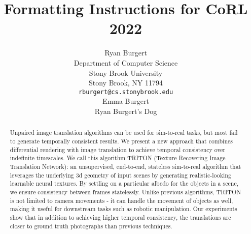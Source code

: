 \documentclass{article}
\title{Formatting Instructions for CoRL 2022}
\author{%
	Ryan Burgert \\
	Department of Computer Science\\
	Stony Brook University\\
	Stony Brook, NY 11794 \\
	\texttt{rburgert@cs.stonybrook.edu} \\
	\And
	Emma Burgert \\
	Ryan Burgert's Dog\\
}
\begin{document}
\maketitle


\begin{abstract}


	Unpaired image translation algorithms can be used for sim-to-real tasks, but most fail to generate temporally consistent results.
	We present a new approach that combines differential rendering with image translation to achieve temporal consistency over indefinite timescales.
%
	We call this algorithm TRITON (Texture Recovering Image Translation Network): an unsupervised, end-to-end, stateless sim-to-real algorithm that 
	leverages the underlying 3d geometry of input scenes by generating realistic-looking learnable neural textures.
%
	By settling on a particular albedo for the objects in a scene, we ensure consistency between frames statelessly.
	Unlike previous algorithms, TRITON is not limited to camera movements - it can handle the movement of objects as well, making it useful for downstream tasks such as robotic manipulation.
	Our experiments show that in addition to achieving higher temporal consistency, the translations are closer to ground truth photographs than previous techniques.
\end{abstract}


\end{document}
